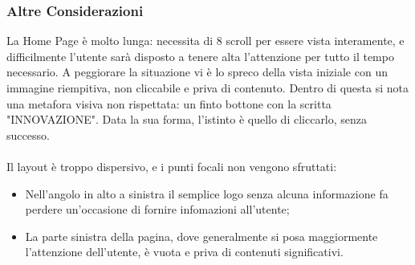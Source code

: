 \subsubsection{Altre Considerazioni}
	La Home Page è molto lunga: necessita di 8 scroll per essere vista interamente, e difficilmente l'utente sarà disposto a tenere alta l'attenzione per tutto il tempo necessario. A peggiorare la situazione vi è lo spreco della vista iniziale con un immagine riempitiva, non cliccabile e priva di contenuto. Dentro di questa si nota una metafora visiva non rispettata: un finto bottone con la scritta "INNOVAZIONE". Data la sua forma, l'istinto è quello di cliccarlo, senza successo. \\ \\
	Il layout è troppo dispersivo, e i punti focali non vengono sfruttati:
	\begin{itemize}
		\item Nell'angolo in alto a sinistra il semplice logo senza alcuna informazione fa perdere un'occasione di fornire infomazioni all'utente;
		\item La parte sinistra della pagina, dove generalmente si posa maggiormente l'attenzione dell'utente, è vuota e priva di contenuti significativi.
	\end{itemize} 
